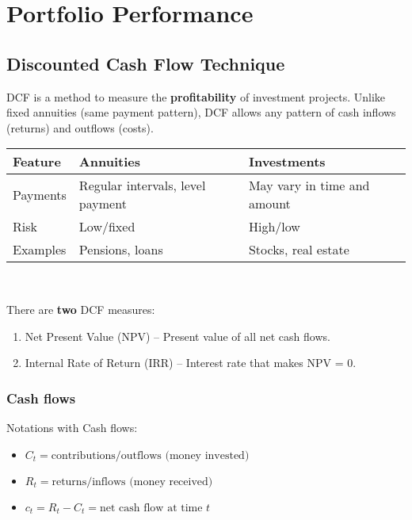 \chapter{Portfolio Performance}

\section{Discounted Cash Flow Technique}

\begin{definition}
    DCF is a method to measure the \textbf{profitability} of investment projects. Unlike fixed annuities (same payment pattern), DCF allows any pattern of cash inflows (returns) and outflows (costs).
\end{definition}

\begin{comments}
\begin{tabular}{|l|l|l|}
\hline
\textbf{Feature} & \textbf{Annuities} & \textbf{Investments} \\
\hline
Payments & Regular intervals, level payment & May vary in time and amount\\
\hline
Risk & Low/fixed & High/low \\
\hline
Examples & Pensions, loans & Stocks, real estate \\
\hline
\end{tabular}
\end{comments}
\\

\begin{comments}
    There are \textbf{two} DCF measures:
\begin{enumerate}  
    \item Net Present Value (NPV) – Present value of all net cash flows. 
    \item Internal Rate of Return (IRR) – Interest rate that makes NPV = 0. 
\end{enumerate}
\end{comments}







\subsection{Cash flows}

\par Notations with Cash flows:
\begin{itemize}[noitemsep] 
    \item $C_t = \text{contributions/outflows (money invested)}$
    \item $R_t = \text{returns/inflows (money received)}$
    \item $c_t = R_t - C_t = \text{net cash flow at time } t $
\end{itemize}

